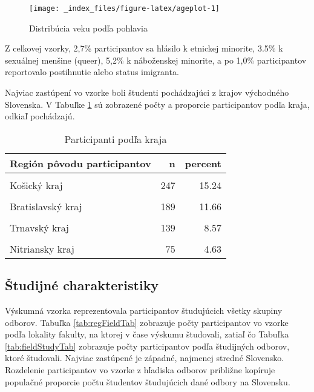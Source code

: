 \documentclass[
]{article}
\begin{document}
\begin{figure}

{\centering \texttt{[image: \_index\_files/figure-latex/ageplot-1]} 

}

\caption{Distribúcia veku podľa pohlavia}\label{fig:ageplot}
\end{figure}

Z celkovej vzorky, 2,7\% participantov sa hlásilo k etnickej minorite, 3.5\% k sexuálnej menšine (queer), 5,2\% k náboženskej minorite, a po 1,0\% participantov reportovalo postihnutie alebo status imigranta.

Najviac zastúpení vo vzorke boli študenti pochádzajúci z krajov východného Slovenska. V Tabuľke \ref{tab:regionTab} sú zobrazené počty a proporcie participantov podľa kraja, odkiaľ pochádzajú.

\begin{table}[H]

\caption{\label{tab:regionTab}Participanti podľa kraja}
\centering
\fontsize{10}{12}\selectfont
\begin{tabular}[t]{lrr}
\toprule
Región pôvodu participantov & n & percent\\
\midrule
\cellcolor{gray!6}{Prešovský kraj} & \cellcolor{gray!6}{382} & \cellcolor{gray!6}{23.57}\\
Košický kraj & 247 & 15.24\\
\cellcolor{gray!6}{Banskobystrický kraj} & \cellcolor{gray!6}{198} & \cellcolor{gray!6}{12.21}\\
Bratislavský kraj & 189 & 11.66\\
\cellcolor{gray!6}{Žilinský kraj} & \cellcolor{gray!6}{155} & \cellcolor{gray!6}{9.56}\\
\addlinespace
Trnavský kraj & 139 & 8.57\\
\cellcolor{gray!6}{Trenčiansky kraj} & \cellcolor{gray!6}{107} & \cellcolor{gray!6}{6.60}\\
Nitriansky kraj & 75 & 4.63\\
\bottomrule
\end{tabular}
\end{table}

\hypertarget{ux161tudijnuxe9-charakteristiky}{%
\subsection{Študijné charakteristiky}\label{ux161tudijnuxe9-charakteristiky}}

Výskumná vzorka reprezentovala participantov študujúcich všetky skupiny odborov. Tabuľka \ref{tab:regFieldTab} zobrazuje počty participantov vo vzorke podľa lokality fakulty, na ktorej v čase výskumu študovali, zatiaľ čo Tabuľka \ref{tab:fieldStudyTab} zobrazuje počty participantov podľa študijných odborov, ktoré študovali. Najviac zastúpené je západné, najmenej stredné Slovensko. Rozdelenie participantov vo vzorke z hľadiska odborov približne kopíruje populačné proporcie počtu študentov študujúcich dané odbory na Slovensku.
\end{document}
